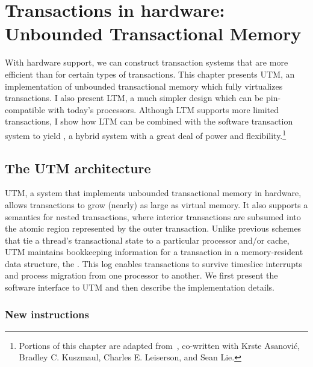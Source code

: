 \setlength{\epigraphwidth}{.4\textwidth}
\chapter{Transactions in hardware: Unbounded Transactional Memory}
\label{cha:htm}\label{cha:hybrid}

With hardware support, we can construct transaction systems that are
more efficient than \apex for certain types of transactions. This chapter
presents UTM, an implementation of unbounded transactional memory
\cite{AnanianAsKuLeLi05,AnanianAsKuLeLi06} which fully virtualizes transactions.  I
also present LTM, a much simpler design which can be
pin-compatible with today's processors.
Although LTM supports more limited
transactions, I show how LTM can be combined with the software \apex
transaction system to yield \hyx, a
hybrid system with a great deal of power and
flexibility.\footnote{Portions of this chapter are adapted
from~\cite{AnanianAsKuLeLi05,AnanianAsKuLeLi06}, co-written with Krste Asanovi\'c,
Bradley C. Kuszmaul, Charles E. Leiserson, and Sean Lie.}

\section{The UTM architecture}\label{sec:utm}
UTM, a system that implements
unbounded transactional memory in hardware, allows
transactions to grow (nearly) as large as virtual memory.  It also
supports a semantics for nested transactions, where interior
transactions are subsumed into the atomic region represented by the
outer transaction.  Unlike previous schemes that tie a thread's
transactional state to a particular processor and/or cache, UTM
maintains bookkeeping information for a transaction in a
memory-resident data structure, the .  This log
enables transactions to survive timeslice interrupts and process
migration from one processor to another.  We first present the
software interface to UTM and then describe the implementation
details.

\subsection{New instructions}


